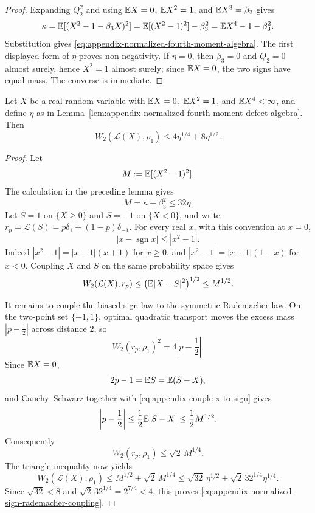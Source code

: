 \begin{proof}
Expanding \(Q_2^2\) and using \(\mathbb{E} X=0\), \(\mathbb{E} X^2=1\), and
\(\mathbb{E} X^3=\beta_3\) gives
\[
\kappa
=\mathbb{E}[(X^2-1-\beta_3X)^2]
=\mathbb{E}[(X^2-1)^2]-\beta_3^2
=\mathbb{E} X^4-1-\beta_3^2.
\]
Substitution gives \eqref{eq:appendix-normalized-fourth-moment-algebra}.
The first displayed form of \(\eta\) proves non-negativity.  If
\(\eta=0\), then \(\beta_3=0\) and \(Q_2=0\) almost surely, hence
\(X^2=1\) almost surely; since \(\mathbb{E} X=0\), the two signs have equal mass.
The converse is immediate.
\end{proof}

\begin{lemma}%
\label{lem:appendix-normalized-fourth-moment-w2-coupling}
Let \(X\) be a real random variable with \(\mathbb{E} X=0\), \(\mathbb{E} X^2=1\), and
\(\mathbb{E} X^4<\infty\), and define \(\eta\) as in
Lemma~\ref{lem:appendix-normalized-fourth-moment-defect-algebra}.  Then
\begin{equation}\label{eq:appendix-normalized-sign-rademacher-coupling}
W_2(\mathcal L(X),\rho_1)
\le 4\eta^{1/4}+8\eta^{1/2}.
\end{equation}
\end{lemma}

\begin{proof}
Let
\[
M:=\mathbb{E}[(X^2-1)^2].
\]
The calculation in the preceding lemma gives
\[
M=\kappa+\beta_3^2\le32\eta .
\]
Let \(S=1\) on \(\{X\ge0\}\) and \(S=-1\) on \(\{X<0\}\), and write
\(r_p=\mathcal L(S)=p\delta_1+(1-p)\delta_{-1}\).  For every real \(x\),
with this convention at \(x=0\),
\[
|x-\operatorname{sgn}x|\le |x^2-1|.
\]
Indeed \(|x^2-1|=|x-1|(x+1)\) for \(x\ge0\), and
\(|x^2-1|=|x+1|(1-x)\) for \(x<0\).  Coupling \(X\) and \(S\) on the same
probability space gives
\begin{equation}\label{eq:appendix-couple-x-to-sign}
W_2(\mathcal L(X),r_p)
\le \bigl(\mathbb{E}|X-S|^2\bigr)^{1/2}
\le M^{1/2}.
\end{equation}

It remains to couple the biased sign law to the symmetric Rademacher law.
On the two-point set \(\{-1,1\}\), optimal quadratic transport moves the
excess mass \(|p-\frac12|\) across distance \(2\), so
\[
W_2(r_p,\rho_1)^2=4\left|p-\frac12\right|.
\]
Since \(\mathbb{E} X=0\),
\[
2p-1=\mathbb{E} S=\mathbb{E}(S-X),
\]
and Cauchy--Schwarz together with
\eqref{eq:appendix-couple-x-to-sign} gives
\[
\left|p-\frac12\right|
\le \frac12\mathbb{E}|S-X|
\le \frac12 M^{1/2}.
\]
Consequently
\[
W_2(r_p,\rho_1)\le \sqrt2\,M^{1/4}.
\]
The triangle inequality now yields
\[
W_2(\mathcal L(X),\rho_1)
\le M^{1/2}+\sqrt2\,M^{1/4}
\le \sqrt{32}\,\eta^{1/2}+\sqrt2\,32^{1/4}\eta^{1/4}.
\]
Since \(\sqrt{32}<8\) and \(\sqrt2\,32^{1/4}=2^{7/4}<4\), this proves
\eqref{eq:appendix-normalized-sign-rademacher-coupling}.
\end{proof}

